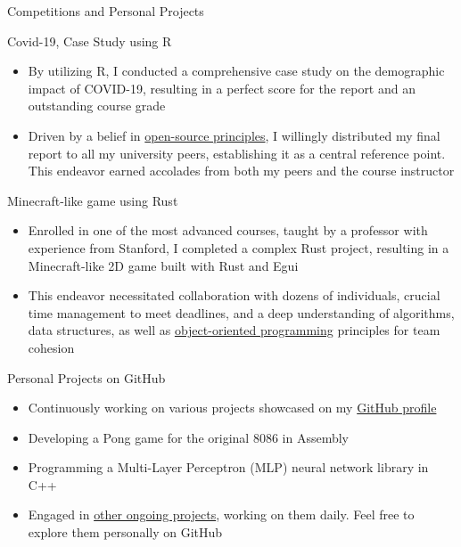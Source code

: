 \documentclass{article}
\newlength{\tabin}
\newlength{\secsep}
\newcommand{\lineunder}{\vspace*{-8pt} \\ \hspace*{-6pt} \hrulefill \\ \vspace*{-15pt}}
\newenvironment{tabbedsection}[1]{
  \begin{list}{}{
      \setlength{\itemsep}{0pt}
      \setlength{\labelsep}{0pt}
      \setlength{\labelwidth}{0pt}
      \setlength{\leftmargin}{\tabin}
      \setlength{\rightmargin}{\tabin}
      \setlength{\listparindent}{0pt}
      \setlength{\parsep}{0pt}
      \setlength{\parskip}{0pt}
      \setlength{\partopsep}{0pt}
      \setlength{\topsep}{#1}
    }
  \item[]
}{\end{list}}
\newenvironment{resume_section}[1]{
  \filbreak
  \vspace{2\secsep}
  \textbf{\textsc{\Large#1}}
  \lineunder
  \begin{tabbedsection}{\secsep}
}{\end{tabbedsection}}
\newenvironment{resume_subsection}[2][]{
  \textbf{#2} \hfill {\footnotesize #1} \hspace{2em}
  \begin{tabbedsection}{0.5\secsep}
}{\end{tabbedsection}}
\newenvironment{subitems}{
  \renewcommand{\labelitemi}{$\bullet$} %
  \begin{itemize}
      \setlength{\labelsep}{1em}
}{\end{itemize}}
\begin{document}
\begin{resume_section}{Competitions and Personal Projects}

  \begin{resume_subsection}{Covid-19, Case Study using R}
    \begin{subitems}
      \item By utilizing R, I conducted a comprehensive case study on the demographic impact of COVID-19, resulting in a perfect score for the report and an outstanding course grade
      \item Driven by a belief in \underline{open-source principles}, I willingly distributed my final report to all my university peers, establishing it as a central reference point. This endeavor earned accolades from both my peers and the course instructor
    \end{subitems}
  \end{resume_subsection}

  \begin{resume_subsection}{Minecraft-like game using Rust}
    \begin{subitems}
      \item Enrolled in one of the most advanced courses, taught by a professor with experience from Stanford, I completed a complex Rust project, resulting in a Minecraft-like 2D game built with Rust and Egui
      \item This endeavor necessitated collaboration with dozens of individuals, crucial time management to meet deadlines, and a deep understanding of algorithms, data structures, as well as \underline{object-oriented programming} principles for team cohesion
    \end{subitems}
  \end{resume_subsection}

  \begin{resume_subsection}[]{Personal Projects on GitHub}
    \begin{subitems}
      \item Continuously working on various projects showcased on my \href{https://github.com/gioele-bernardini}{GitHub profile}
      \item Developing a Pong game for the original 8086 in Assembly
      \item Programming a Multi-Layer Perceptron (MLP) neural network library in C++
      \item Engaged in \underline{other ongoing projects}, working on them daily. Feel free to explore them personally on GitHub
    \end{subitems}
  \end{resume_subsection}

\end{resume_section}
\end{document}
